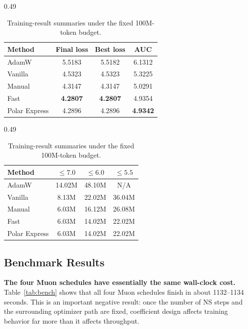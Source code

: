 \documentclass[10pt]{article}
\begin{document}
\begin{table}[t]
\centering

\begin{subtable}[t]{0.49\linewidth}
    \centering
    \caption{Training metrics under the fixed 100M-token budget.}
    \label{tab:train}
    \small
    \begin{tabular*}{\linewidth}{@{\extracolsep{\fill}}lccc@{}}
    \toprule
    Method & Final loss & Best loss & AUC \\
    \midrule
    AdamW & 5.5183 & 5.5182 & 6.1312 \\
    Vanilla & 4.5323 & 4.5323 & 5.3225 \\
    Manual & 4.3147 & 4.3147 & 5.0291 \\
    Fast & \textbf{4.2807} & \textbf{4.2807} & 4.9354 \\
    Polar Express & 4.2896 & 4.2896 & \textbf{4.9342} \\
    \bottomrule
    \end{tabular*}
\end{subtable}\hfill
\begin{subtable}[t]{0.49\linewidth}
    \centering
    \caption{Training tokens needed to reach validation-loss thresholds.}
    \label{tab:threshold}
    \small
    \begin{tabular*}{\linewidth}{@{\extracolsep{\fill}}lccc@{}}
    \toprule
    Method & $\le 7.0$ & $\le 6.0$ & $\le 5.5$ \\
    \midrule
    AdamW & 14.02M & 48.10M & N/A \\
    Vanilla & 8.13M & 22.02M & 36.04M \\
    Manual & 6.03M & 16.12M & 26.08M \\
    Fast & 6.03M & 14.02M & 22.02M \\
    Polar Express & 6.03M & 14.02M & 22.02M \\
    \bottomrule
    \end{tabular*}
\end{subtable}

\caption{Training-result summaries under the fixed 100M-token budget.}
\label{tab:train-group}
\end{table}

\subsection{Benchmark Results}
\textbf{The four Muon schedules have essentially the same wall-clock cost.} Table~\ref{tab:bench} shows that all four Muon schedules finish in about 1132--1134 seconds. This is an important negative result: once the number of NS steps and the surrounding optimizer path are fixed, coefficient design affects training behavior far more than it affects throughput.
\end{document}

